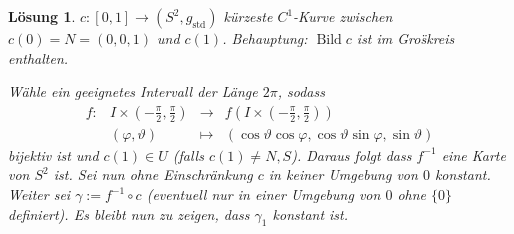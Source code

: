 \documentclass[paper=A4, twoside, chapterprefix=true, bibliography=totoc, headsepline]{scrbook}
\let\temp\phi{}
\let\phi\varphi{}
\let\varphi\temp{}
\let\temp\theta{}
\let\theta\vartheta{}
\let\vartheta\temp{}
\let\temp\epsilon{}
\let\epsilon\varepsilon{}
\let\varepsilon\temp{}
\let\temp\rho{}
\let\rho\varrho{}
\let\varrho\temp{}
\DeclareMathOperator{\Bild}{Bild}
\newcommand{\X}{\times}
\theoremstyle{plain}
\theoremstyle{nonumberplain}
\theoremstyle{empty}
\theoremstyle{break}
\newtheorem{Loes}{L\"osung}
\begin{document}
\begin{Loes}
$c: [0,1] \to (S^2, g_{\text{std}})$ k\"urzeste $C^1$-Kurve zwischen $c(0) = N = (0,0,1)$ und $c(1)$. \emph{Behauptung:} $\Bild c$ ist im Gro\"skreis enthalten.

W\"ahle ein geeignetes Intervall der L\"ange $2 \pi$, sodass
	\[\begin{array}{cccc} f: & I \X \left( -\frac{\pi}{2}, \frac{\pi}{2} \right) &\to& f \left( I \X \left( -\frac{\pi}{2}, \frac{\pi}{2} \right) \right)\\
		& (\phi, \theta) &\mapsto& (\cos\theta \cos\phi, \cos\theta\sin\phi, \sin\theta)\end{array}\]
bijektiv ist und $c(1) \in U$ (falls $c(1) \ne N,S$). Daraus folgt dass $f^{-1}$ eine Karte von $S^2$ ist. Sei nun ohne Einschr\"ankung $c$ in keiner Umgebung von $0$ konstant. Weiter sei $\gamma := f^{-1} \circ c$ (eventuell nur in einer Umgebung von $0$ ohne $\{0\}$ definiert). Es bleibt nun zu zeigen, dass $\gamma_1$ konstant ist.


\end{Loes}
\end{document}
